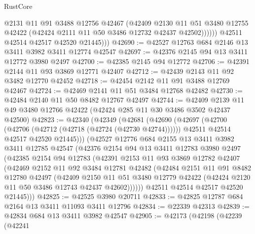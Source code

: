 \begin{lexlean}{RustCore}
\begin{coremodule}
                  @2131
                  @11
                  @91
                  @3488
                  @12756
                  @42467
                  (@42409
                    @2130
                    @11
                    @51
                    @3480
                    @12755
                    @42422
                    (@42424 @2111 @11 @50 @3486 @12732 @42437 @42502))))))
          @42511
          @42514
          @42517
          @42520
          @21445)))
@42690 := @42527 @12763 @684 @2146 @13 @3411 @3982 @3411 @12774 @42547
@42697 := @42376 @2145 @94 @13 @3411 @12772 @3980 @2497
@42700 := @42385 @2145 @94 @12772
@42706 := @42391 @2144 @11 @93 @3869 @12771 @42407
@42712 := @42439 @2143 @11 @92 @3482 @12770 @42452
@42718 := @42454 @2142 @11 @91 @3488 @12769 @42467
@42724 := @42469 @2141 @11 @51 @3484 @12768 @42482
@42730 := @42484 @2140 @11 @50 @8482 @12767 @42497
@42744 := @42409 @2139 @11 @49 @3480 @12766 @42422 (@42424 @285 @11 @30 @3486 @3502 @42437 @42500)
@42823 := @42340
    (@42349
      (@42681
        (@42690
          (@42697
            (@42700 (@42706 (@42712 (@42718 (@42724 (@42730 @42744))))))
            @42511
            @42514
            @42517
            @42520
            @21445)))
      (@42527
        @12776
        @684
        @2155
        @13
        @3411
        @3982
        @3411
        @12785
        @42547
        (@42376
          @2154
          @94
          @13
          @3411
          @12783
          @3980
          @2497
          (@42385
            @2154
            @94
            @12783
            (@42391
              @2153
              @11
              @93
              @3869
              @12782
              @42407
              (@42469
                @2152
                @11
                @92
                @3484
                @12781
                @42482
                (@42484
                  @2151
                  @11
                  @91
                  @8482
                  @12780
                  @42497
                  (@42409
                    @2150
                    @11
                    @51
                    @3480
                    @12779
                    @42422
                    (@42424 @2120 @11 @50 @3486 @12743 @42437 @42602))))))
          @42511
          @42514
          @42517
          @42520
          @21445)))
@42825 := @42525 @3980 @20711
@42833 := @42825 @12787 @684 @2164 @13 @3411 @11093 @3411 @12796
@42834 := @22339 @42313
@42839 := @42834 @684 @13 @3411 @3982 @42547
@42905 := @42173
    (@42198
      (@42239
        (@42241

\end{coremodule}
\end{lexlean}

